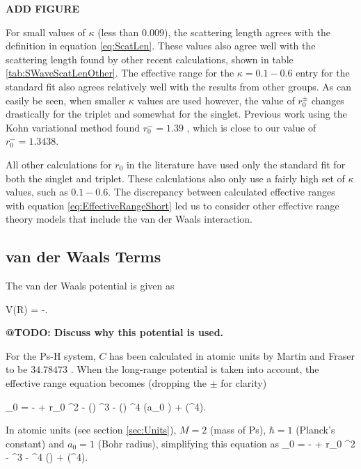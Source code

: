 \documentclass[Dissertation.tex]{subfiles}
\begin{document}
\textbf{ADD FIGURE}

For small values of $\kappa$ (less than 0.009), the scattering length agrees with the definition in equation \ref{eq:ScatLen}. These values also agree well with the scattering length found by other recent calculations, shown in table \ref{tab:SWaveScatLenOther}. The effective range for the $\kappa = 0.1 - 0.6$ entry for the standard fit also agrees relatively well with the results from other groups. As can easily be seen, when smaller $\kappa$ values are used however, the value of $r_0^\pm$ changes drastically for the triplet and somewhat for the singlet. Previous work using the Kohn variational method found $r_0^- = 1.39$ \cite{VanReeth2003}, which is close to our value of $r_0^- = 1.3438$.

All other calculations for $r_0$ in the literature have used only the standard fit for both the singlet and triplet. These calculations also only use a fairly high set of $\kappa$ values, such as $0.1 - 0.6$. The discrepancy between calculated effective ranges with equation \ref{eq:EffectiveRangeShort} led us to consider other effective range theory models that include the van der Waals interaction.

\subsection{van der Waals Terms}
\label{sec:vanderWaalsERT}

The van der Waals potential is given as

\beq
\label{eq:VanderWaals}
V(R) = -.
\eeq

\textbf{@TODO: Discuss why this potential is used.}

\noindent For the Ps-H system, $C$ has been calculated in atomic units by Martin and Fraser to be $34.78473$ \cite{Martin1980}. When the long-range potential is taken into account, the effective range equation becomes (dropping the $\pm$ for clarity) \cite[pg. 669]{Drake2006}

\beq
\label{eq:EffectiveRangeLong}
\kappa \cot\eta_0 = - +  r_0 \kappa^2 -  \left(\right) \kappa^3 -  \left(\right) \kappa^4 \ln \left(\kappa a_0 \right) + (\kappa^4).
\eeq

\noindent In atomic units (see section \ref{sec:Units}), $M = 2$ (mass of Ps), $\hbar = 1$ (Planck's constant) and $a_0 = 1$ (Bohr radius), simplifying this equation as
\beq
\label{eq:EffectiveRangeLongAu}
\kappa \cot\eta_0 = - +  r_0 \kappa^2 -  \kappa^3 -  \kappa^4 \ln \left(\kappa \right) + (\kappa^4).
\eeq
\end{document}
